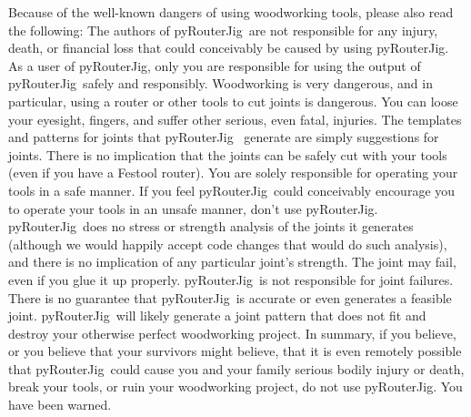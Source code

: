 \documentclass[12pt,final]{article}
\newcommand{\codename}[0]{pyRouterJig}
\begin{document}
Because of the well-known dangers of using woodworking tools, please also read
the following: The authors of \codename~are not responsible for any injury,
death, or financial loss that could conceivably be caused by using \codename.  As a user
of \codename, only you are responsible for using the output of
\codename~safely and responsibly.  Woodworking is very dangerous, and in
particular, using a router or other tools to cut joints is dangerous.  You can
loose your eyesight, fingers, and suffer other serious, even fatal,
injuries. The templates and patterns for joints that \codename~ generate are
simply suggestions for joints.  There is no implication that the joints can be
safely cut with your tools (even if you have a Festool router).  You are
solely responsible for operating your tools in a safe manner.  If you feel
\codename~could conceivably encourage you to operate your tools in an unsafe
manner, don't use \codename.  \codename~does no stress or strength analysis of
the joints it generates (although we would happily accept code changes that
would do such analysis), and there is no implication of any particular joint's
strength.  The joint may fail, even if you glue it up properly. \codename~is
not responsible for joint failures.  There is no guarantee that \codename~is
accurate or even generates a feasible joint.  \codename~will likely generate a
joint pattern that does not fit and destroy your otherwise perfect woodworking
project.  In summary, if you believe, or you believe that your survivors might
believe, that it is even remotely possible that \codename~could cause you and
your family serious bodily injury or death, break your tools, or ruin your
woodworking project, do not use \codename.  You have been warned.
\end{document}
